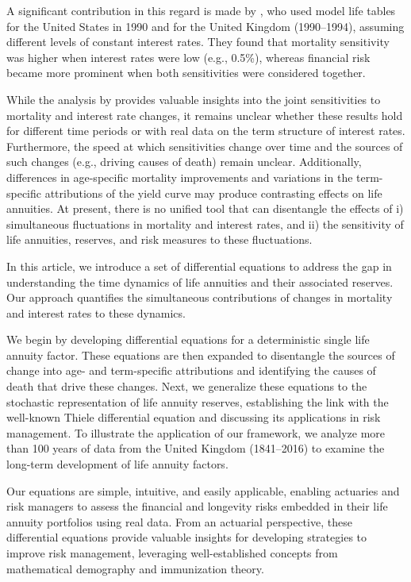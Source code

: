 \documentclass[12pt]{article}
\begin{document}
A significant contribution in this regard is made by \citet{rabitti2020mortality}, who used model life tables for the United States in 1990 and for the United Kingdom (1990–1994), assuming different levels of constant interest rates. They found that mortality sensitivity was higher when interest rates were low (e.g., 0.5\%), whereas financial risk became more prominent when both sensitivities were considered together.

While the analysis by \citet{rabitti2020mortality} provides valuable insights into the joint sensitivities to mortality and interest rate changes, it remains unclear whether these results hold for different time periods or with real data on the term structure of interest rates. Furthermore, the speed at which sensitivities change over time and the sources of such changes (e.g., driving causes of death) remain unclear. Additionally, differences in age-specific mortality improvements and variations in the term-specific attributions of the yield curve may produce contrasting effects on life annuities. At present, there is no unified tool that can disentangle the effects of i) simultaneous fluctuations in mortality and interest rates, and ii) the sensitivity of life annuities, reserves, and risk measures to these fluctuations.

In this article, we introduce a set of differential equations to address the gap in understanding the time dynamics of life annuities and their associated reserves. Our approach quantifies the simultaneous contributions of changes in mortality and interest rates to these dynamics.

We begin by developing differential equations for a deterministic single life annuity factor. These equations are then expanded to disentangle the sources of change into age- and term-specific attributions and identifying the causes of death that drive these changes. Next, we generalize these equations to the stochastic representation of life annuity reserves, establishing the link with the well-known Thiele differential equation and discussing its applications in risk management. To illustrate the application of our framework, we analyze more than 100 years of data from the United Kingdom (1841–2016) to examine the long-term development of life annuity factors.


Our equations are simple, intuitive, and easily applicable, enabling actuaries and risk managers to assess the financial and longevity risks embedded in their life annuity portfolios using real data. From an actuarial perspective, these differential equations provide valuable insights for developing strategies to improve risk management, leveraging well-established concepts from mathematical demography and immunization theory.
\end{document}
